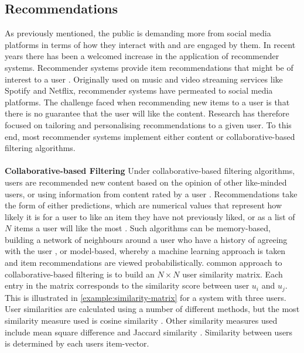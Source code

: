 \subsection{Recommendations}
As previously mentioned, the public is demanding more from social media platforms in terms of how they interact with and are engaged by them. In recent years there has been a welcomed increase in the application of recommender systems. Recommender systems provide item recommendations that might be of interest to a user \cite{ricci2011introduction}. Originally used on music and video streaming services like Spotify and Netflix, recommender systems have permeated to social media platforms. The challenge faced when recommending new items to a user is that there is no guarantee that the user will like the content. Research has therefore focused on tailoring and personalising recommendations to a given user. To this end, most recommender systems implement either content or collaborative-based filtering algorithms.
\\
\\
\textbf{Collaborative-based Filtering} Under collaborative-based filtering algorithms, users are recommended new content based on the opinion of other like-minded users, or using information from content rated by a user \cite{sarwar2001item}. Recommendations take the form of either predictions, which are numerical values that represent how likely it is for a user to like an item they have not previously liked, or as a list of $N$ items a user will like the most \cite{sarwar2001item}. Such algorithms can be memory-based, building a network of neighbours around a user who have a history of agreeing with the user \cite{sarwar2001item}, or model-based, whereby a machine learning approach is taken and item recommendations are viewed probabilistically.  common approach to collaborative-based filtering is to build an $N \times N$ user similarity matrix. Each entry in the matrix corresponds to the similarity score between user $u_i$ and $u_j$. This is illustrated in \ref{example:similarity-matrix} for a system with three users. User similarities are calculated using a number of different methods, but the most similarity measure used is cosine similarity \cite{linden2003amazon} \cite{sarwar2001item} \cite{liu2014new}. Other similarity measures used include mean square difference and Jaccard similarity \cite{liu2014new}. Similarity between users is determined by each users item-vector.
